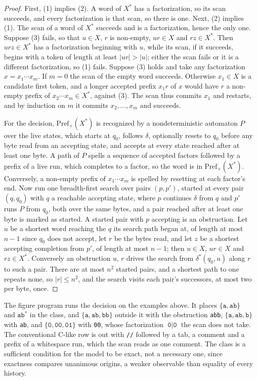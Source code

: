 \documentclass[11pt,a4paper]{article}
\theoremstyle{definition}
\theoremstyle{plain}
\newcommand{\code}[1]{\texttt{#1}}
\begin{document}
\begin{proof}
First, (1) implies (2). A word of $X^*$ has a factorization, so its scan succeeds, and every factorization is that scan,
so there is one. Next, (2) implies (1). The scan of a word of $X^*$ succeeds and is a factorization, hence the only one.
Suppose (3) fails, so that $u \in X$, $r$ is non-empty, $u r \in X$ and $r z \in X^*$. Then $u r z \in X^*$ has a
factorization beginning with $u$, while its scan, if it succeeds, begins with a token of length at least $|u r| > |u|$;
either the scan fails or it is a different factorization, so (1) fails. Suppose (3) holds and take any factorization
$x = x_1 \cdots x_m$. If $m = 0$ the scan of the empty word succeeds. Otherwise $x_1 \in X$ is a candidate first token,
and a longer accepted prefix $x_1 r$ of $x$ would have $r$ a non-empty prefix of $x_2 \cdots x_m \in X^*$, against (3).
The scan thus commits $x_1$ and restarts, and by induction on $m$ it commits $x_2, \ldots, x_m$ and succeeds.

For the decision, $\mathrm{Pref}_+(X^*)$ is recognized by a nondeterministic automaton $P$ over the live states, which
starts at $q_0$, follows $\delta$, optionally resets to $q_0$ before any byte read from an accepting state, and accepts
at every state reached after at least one byte. A path of $P$ spells a sequence of accepted factors followed by a prefix
of a live run, which completes to a factor, so the word is in $\mathrm{Pref}_+(X^*)$. Conversely, a non-empty prefix of
$x_1 \cdots x_m$ is spelled by resetting at each factor's end. Now run one breadth-first search over pairs $(p, p')$,
started at every pair $(q, q_0)$ with $q$ a reachable accepting state, where $p$ continues $\delta$ from $q$ and $p'$
runs $P$ from $q_0$, both over the same bytes, and a pair reached after at least one byte is marked as started. A
started pair with $p$ accepting is an obstruction. Let $u$ be a shortest word reaching the $q$ its search path began at,
of length at most $n - 1$ since $q_0$ does not accept, let $r$ be the bytes read, and let $z$ be a shortest accepting
completion from $p'$, of length at most $n - 1$; then $u \in X$, $u r \in X$ and $r z \in X^*$. Conversely an
obstruction $u$, $r$ drives the search from $\delta^*(q_0, u)$ along $r$ to such a pair. There are at most $n^2$ started
pairs, and a shortest path to one repeats none, so $|r| \leq n^2$, and the search visits each pair's successors, at most
two per byte, once.
\end{proof}

The figure program runs the decision on the examples above. It places $\{\code{a}, \code{ab}\}$ and $\code{ab}^*$ in the
class, and $\{\code{a}, \code{ab}, \code{bb}\}$ outside it with the obstruction \code{abb},
$\{\code{a}, \code{ab}, \code{b}\}$ with \code{ab}, and $\{\code{0}, \code{00}, \code{01}\}$ with \code{00}, whose
factorization $\code{0} \mid \code{0}$ the scan does not take. The conventional C-like row is out with \code{//}
followed by a tab, a comment and a prefix of a whitespace run, which the scan reads as one comment. The class is a
sufficient condition for the model to be exact, not a necessary one, since exactness compares unanimous origins, a
weaker observable than equality of every history.
\end{document}
